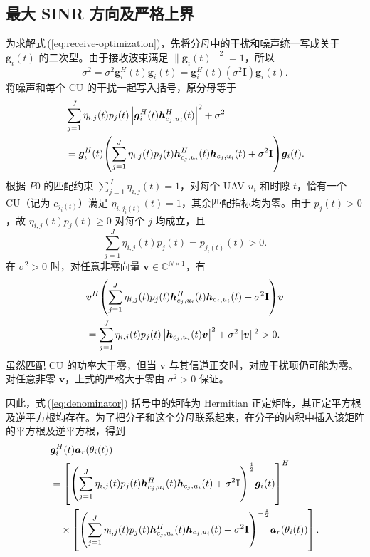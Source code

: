 \documentclass[11pt,a4paper]{ctexart}
\begin{document}
\subsection{最大 SINR 方向及严格上界}
为求解式\,(\ref{eq:receive-optimization})，先将分母中的干扰和噪声统一写成关于 $\bm g_i(t)$ 的二次型。由于接收波束满足 $\|\bm g_i(t)\|^2=1$，所以
\begin{equation}
\sigma^2=\sigma^2\bm g_i^H(t)\bm g_i(t)
=\bm g_i^H(t)(\sigma^2\mathbf I)\bm g_i(t).
\end{equation}
将噪声和每个 CU 的干扰一起写入括号，原分母等于
\begin{align}\label{eq:denominator}
&\sum_{j=1}^J\eta_{i,j}(t)p_j(t)
\left|\bm g_i^H(t)\bm h_{c_j,u_i}^{H}(t)\right|^2+\sigma^2\notag\\
&=\bm g_i^H(t)\!\left(\sum_{j=1}^J\eta_{i,j}(t)p_j(t)
\bm h_{c_j,u_i}^{H}(t)\bm h_{c_j,u_i}(t)+\sigma^2\mathbf I\right)\!\bm g_i(t).
\end{align}
根据 $P0$ 的匹配约束 $\sum_{j=1}^{J}\eta_{i,j}(t)=1$，对每个 UAV $u_i$ 和时隙 $t$，恰有一个 CU（记为 $c_{j_i(t)}$）满足 $\eta_{i,j_i(t)}(t)=1$，其余匹配指标均为零。由于 $p_j(t)>0$，故 $\eta_{i,j}(t)p_j(t)\ge0$ 对每个 $j$ 均成立，且
\begin{equation}
\sum_{j=1}^{J}\eta_{i,j}(t)p_j(t)=p_{j_i(t)}(t)>0.
\end{equation}
在 $\sigma^2>0$ 时，对任意非零向量 $\bm v\in\mathbb C^{N\times1}$，有
\begin{align}
&\bm v^H\!\left(\sum_{j=1}^J\eta_{i,j}(t)p_j(t)
\bm h_{c_j,u_i}^{H}(t)\bm h_{c_j,u_i}(t)+\sigma^2\mathbf I\right)\!\bm v\notag\\
&=\sum_{j=1}^J\eta_{i,j}(t)p_j(t)
\left|\bm h_{c_j,u_i}(t)\bm v\right|^2+\sigma^2\|\bm v\|^2>0.
\end{align}
虽然匹配 CU 的功率大于零，但当 $\bm v$ 与其信道正交时，对应干扰项仍可能为零。对任意非零 $\bm v$，上式的严格大于零由 $\sigma^2>0$ 保证。
\begin{samepage}
因此，式\,(\ref{eq:denominator}) 括号中的矩阵为 Hermitian 正定矩阵，其正定平方根及逆平方根均存在。为了把分子和这个分母联系起来，在分子的内积中插入该矩阵的平方根及逆平方根，得到
\begin{align}\label{eq:sqrt-insertion}
&\bm g_i^H(t)\bm a_r(\theta_i(t))\notag\\
&=\left[\left(\sum_{j=1}^J\eta_{i,j}(t)p_j(t)
\bm h_{c_j,u_i}^{H}(t)\bm h_{c_j,u_i}(t)+\sigma^2\mathbf I\right)^{\frac12}\!\bm g_i(t)\right]^H\notag\\
&\quad\times\left[\left(\sum_{j=1}^J\eta_{i,j}(t)p_j(t)
\bm h_{c_j,u_i}^{H}(t)\bm h_{c_j,u_i}(t)+\sigma^2\mathbf I\right)^{-\frac12}\!\bm a_r(\theta_i(t))\right].
\end{align}
\end{samepage}
\end{document}
